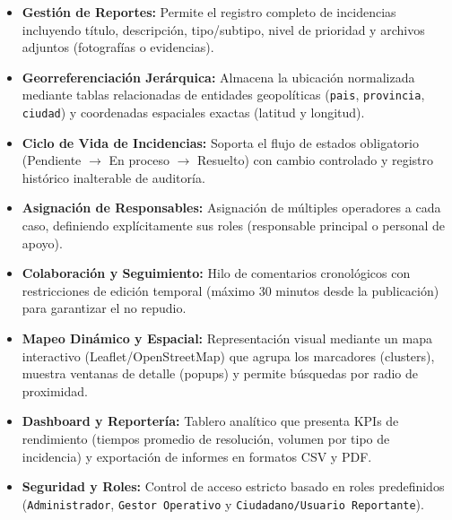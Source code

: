 \begin{itemize}
    \item \textbf{Gestión de Reportes:} Permite el registro completo de incidencias incluyendo título, descripción, tipo/subtipo, nivel de prioridad y archivos adjuntos (fotografías o evidencias).
    \item \textbf{Georreferenciación Jerárquica:} Almacena la ubicación normalizada mediante tablas relacionadas de entidades geopolíticas (\texttt{pais}, \texttt{provincia}, \texttt{ciudad}) y coordenadas espaciales exactas (latitud y longitud).
    \item \textbf{Ciclo de Vida de Incidencias:} Soporta el flujo de estados obligatorio (Pendiente $\rightarrow$ En proceso $\rightarrow$ Resuelto) con cambio controlado y registro histórico inalterable de auditoría.
    \item \textbf{Asignación de Responsables:} Asignación de múltiples operadores a cada caso, definiendo explícitamente sus roles (responsable principal o personal de apoyo).
    \item \textbf{Colaboración y Seguimiento:} Hilo de comentarios cronológicos con restricciones de edición temporal (máximo 30 minutos desde la publicación) para garantizar el no repudio.
    \item \textbf{Mapeo Dinámico y Espacial:} Representación visual mediante un mapa interactivo (Leaflet/OpenStreetMap) que agrupa los marcadores (clusters), muestra ventanas de detalle (popups) y permite búsquedas por radio de proximidad.
    \item \textbf{Dashboard y Reportería:} Tablero analítico que presenta KPIs de rendimiento (tiempos promedio de resolución, volumen por tipo de incidencia) y exportación de informes en formatos CSV y PDF.
    \item \textbf{Seguridad y Roles:} Control de acceso estricto basado en roles predefinidos (\texttt{Administrador}, \texttt{Gestor Operativo} y \texttt{Ciudadano/Usuario Reportante}).
\end{itemize}

